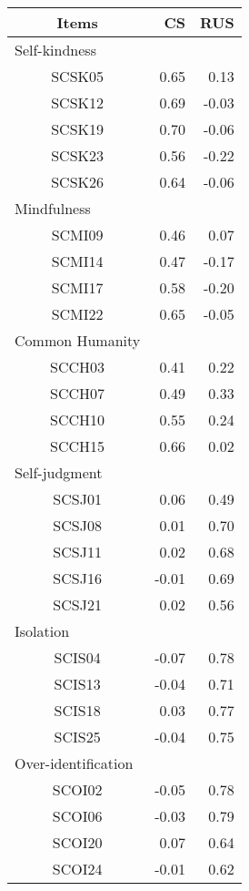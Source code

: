 \captionsetup[table]{labelformat=empty,skip=1pt}
\begin{longtable}{crr}
\toprule
Items & CS & RUS \\ 
\midrule
\multicolumn{1}{l}{Self-kindness} \\ 
\midrule
SCSK05 & 0.65 & 0.13 \\ 
SCSK12 & 0.69 & -0.03 \\ 
SCSK19 & 0.70 & -0.06 \\ 
SCSK23 & 0.56 & -0.22 \\ 
SCSK26 & 0.64 & -0.06 \\ 
\midrule
\multicolumn{1}{l}{Mindfulness} \\ 
\midrule
SCMI09 & 0.46 & 0.07 \\ 
SCMI14 & 0.47 & -0.17 \\ 
SCMI17 & 0.58 & -0.20 \\ 
SCMI22 & 0.65 & -0.05 \\ 
\midrule
\multicolumn{1}{l}{Common Humanity} \\ 
\midrule
SCCH03 & 0.41 & 0.22 \\ 
SCCH07 & 0.49 & 0.33 \\ 
SCCH10 & 0.55 & 0.24 \\ 
SCCH15 & 0.66 & 0.02 \\ 
\midrule
\multicolumn{1}{l}{Self-judgment} \\ 
\midrule
SCSJ01 & 0.06 & 0.49 \\ 
SCSJ08 & 0.01 & 0.70 \\ 
SCSJ11 & 0.02 & 0.68 \\ 
SCSJ16 & -0.01 & 0.69 \\ 
SCSJ21 & 0.02 & 0.56 \\ 
\midrule
\multicolumn{1}{l}{Isolation} \\ 
\midrule
SCIS04 & -0.07 & 0.78 \\ 
SCIS13 & -0.04 & 0.71 \\ 
SCIS18 & 0.03 & 0.77 \\ 
SCIS25 & -0.04 & 0.75 \\ 
\midrule
\multicolumn{1}{l}{Over-identification} \\ 
\midrule
SCOI02 & -0.05 & 0.78 \\ 
SCOI06 & -0.03 & 0.79 \\ 
SCOI20 & 0.07 & 0.64 \\ 
SCOI24 & -0.01 & 0.62 \\ 
\bottomrule
\end{longtable}

